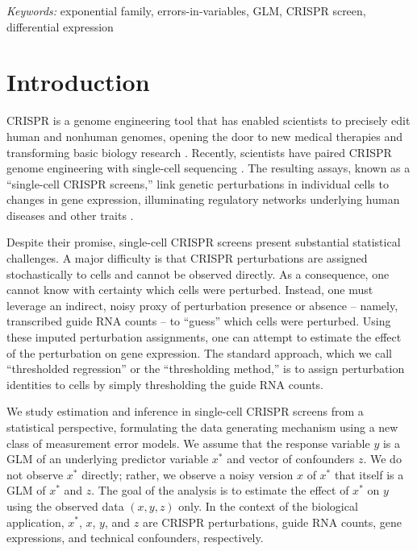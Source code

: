 \documentclass[12pt]{article}
\begin{document}
\noindent
{\it Keywords:}  exponential family, errors-in-variables, GLM, CRISPR screen, differential expression
\section{Introduction}
CRISPR is a genome engineering tool that has enabled scientists to precisely edit human and nonhuman genomes, opening the door to new medical therapies \cite{Rothgangl2021,Musunuru2021} and transforming basic biology research \cite{Przybyla2021}. Recently, scientists have paired CRISPR genome engineering with single-cell sequencing \cite{Dixit2016,Datlinger2017}. The resulting assays, known as a ``single-cell CRISPR screens,'' link genetic perturbations in individual cells to changes in gene expression, illuminating regulatory networks underlying human diseases and other traits \cite{Morris2021a}.

Despite their promise, single-cell CRISPR screens present substantial statistical challenges. A major difficulty is that CRISPR perturbations are assigned stochastically to cells and cannot be observed directly. As a consequence, one cannot know with certainty which cells were perturbed. Instead, one must leverage an indirect, noisy proxy of perturbation presence or absence -- namely, transcribed guide RNA counts -- to ``guess'' which cells were perturbed. Using these imputed perturbation assignments, one can attempt to estimate the effect of the perturbation on gene expression. The standard approach, which we call ``thresholded regression'' or the ``thresholding method,'' is to assign perturbation identities to cells by simply thresholding the guide RNA counts.

We study estimation and inference in single-cell CRISPR screens from a statistical perspective, formulating the data generating mechanism using a new class of measurement error models. We assume that the response variable $y$ is a GLM of an underlying predictor variable $x^*$ and vector of confounders $z$. We do not observe $x^*$ directly; rather, we observe a noisy version $x$ of $x^*$ that itself is a GLM of $x^*$ and $z$. The goal of the analysis is to estimate the effect of $x^*$ on $y$ using the observed data $(x, y, z)$ only. In the context of the biological application, $x^*$, $x$, $y$, and $z$ are CRISPR perturbations, guide RNA counts, gene expressions, and technical confounders, respectively.
\end{document}
